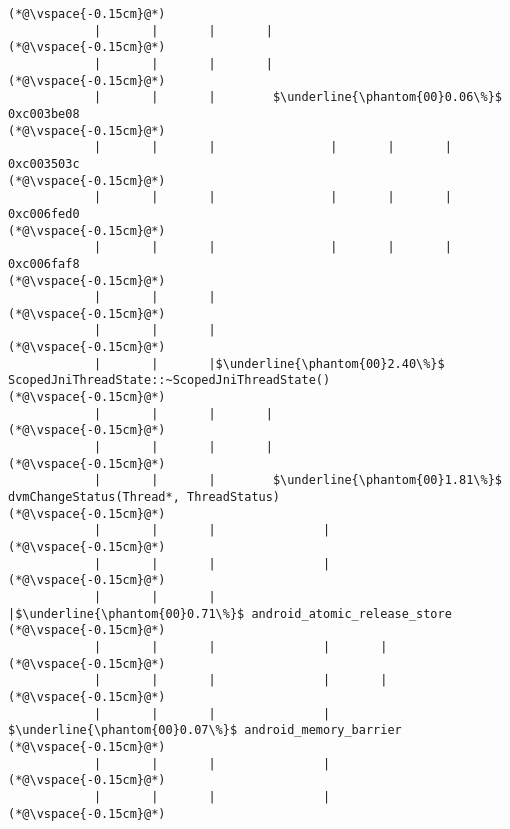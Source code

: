 \begin{lstlisting}[caption=Unicode-merkkijonon osoitinoperaatio, label=profile:C2JReadUnicode-512, numberbychapter=true, frame=lines, float, floatplacement=t]
(*@\vspace{-0.15cm}@*)
            |       |       |       |
(*@\vspace{-0.15cm}@*)
            |       |       |       |
(*@\vspace{-0.15cm}@*)
            |       |       |        $\underline{\phantom{00}0.06\%}$ 0xc003be08
(*@\vspace{-0.15cm}@*)
            |       |       |                |       |       |               0xc003503c
(*@\vspace{-0.15cm}@*)
            |       |       |                |       |       |               0xc006fed0
(*@\vspace{-0.15cm}@*)
            |       |       |                |       |       |               0xc006faf8
(*@\vspace{-0.15cm}@*)
            |       |       |
(*@\vspace{-0.15cm}@*)
            |       |       |
(*@\vspace{-0.15cm}@*)
            |       |       |$\underline{\phantom{00}2.40\%}$ ScopedJniThreadState::~ScopedJniThreadState()
(*@\vspace{-0.15cm}@*)
            |       |       |       |
(*@\vspace{-0.15cm}@*)
            |       |       |       |
(*@\vspace{-0.15cm}@*)
            |       |       |        $\underline{\phantom{00}1.81\%}$ dvmChangeStatus(Thread*, ThreadStatus)
(*@\vspace{-0.15cm}@*)
            |       |       |               |
(*@\vspace{-0.15cm}@*)
            |       |       |               |
(*@\vspace{-0.15cm}@*)
            |       |       |               |$\underline{\phantom{00}0.71\%}$ android_atomic_release_store
(*@\vspace{-0.15cm}@*)
            |       |       |               |       |
(*@\vspace{-0.15cm}@*)
            |       |       |               |       |
(*@\vspace{-0.15cm}@*)
            |       |       |               |        $\underline{\phantom{00}0.07\%}$ android_memory_barrier
(*@\vspace{-0.15cm}@*)
            |       |       |               |
(*@\vspace{-0.15cm}@*)
            |       |       |               |
(*@\vspace{-0.15cm}@*)

\end{lstlisting}
